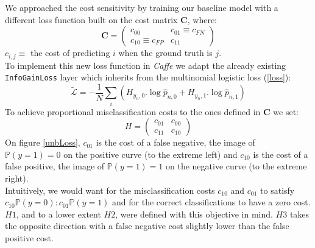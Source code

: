 \documentclass[a4paper]{article}
\newcommand{\p}{\mathbb{P}}
\begin{document}
            We approached the cost sensitivity by training our baseline model with a different loss function built on the cost matrix $\mathbf C$, where:
            \[
            \mathbf C = 
            \begin{pmatrix}
            c_{00}&c_{01}\equiv c_{FN}\\
            c_{10}\equiv c_{FP}&c_{11}
            \end{pmatrix}
            \]
            $c_{i,j}\equiv$ the cost of predicting $i$ when the ground truth is $j$.\\
            To implement this new loss function in \textit{Caffe} we adapt the already existing \texttt{InfoGainLoss} layer which inherits from the multinomial logistic loss (\ref{loss}):\\
            \[\mathcal {\tilde L}=-\frac{1}{N}\sum_i\left(H_{y_n,0}.\log\hat p_{n,0}+H_{y_n,1}.\log\hat p_{n,1}\right)\]
            To achieve proportional misclassification costs to the ones defined in $\mathbf C$ we set:
            \[H = 
            \begin{pmatrix}
            c_{01}&c_{00}\\
            c_{11}&c_{10}
            \end{pmatrix}\]
            On figure \ref{unbLoss}, $c_{01}$ is the cost of a false negative, the image of $\p(y=1)=0$ on the positive curve (to the extreme left) and $c_{10}$ is the cost of a false positive, the image of $\p(y=1)=1$ on the negative curve (to the extreme right).\\
            Intuitively, we would want for the misclassification costs $c_{10}$ and $c_{01}$ to satisfy $c_{10}\p(y=0) : c_{01}\p(y=1)$ and for the correct classifications to have a zero cost. $H1$, and to a lower extent $H2$, were defined with this objective in mind. $H3$ takes the opposite direction with a false negative cost slightly lower than the false positive cost. 
\end{document}
